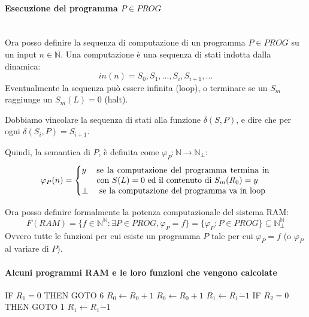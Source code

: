 \documentclass{article}
\begin{document}
\begin{itemize}
          \paragraph{Esecuzione del programma $P\in PROG$}\mbox{}\\
          Ora posso definire la sequenza di computazione di un programma $P\in PROG$ su un input $n\in\mathbb{N}$.
          Una computazione è una sequenza di stati indotta dalla dinamica:
          $$in(n)=S_0, S_1,...,S_i,S_{i+1},...$$
          Eventualmente la sequenza può essere infinita (loop), o terminare se un $S_m$
          raggiunge un $S_m(L)=0$ (halt).

          Dobbiamo vincolare la sequenza di stati alla funzione $\delta (S,P)$,
          e dire che per ogni $\delta(S_i,P)= S_{i+1}$.

          Quindi, la semantica di $P$, è definita come $\varphi_P:\mathbb{N}\rightarrow\mathbb{N}_\bot$:
          \[
              \varphi_P(n)=
              \begin{cases}
                  y    & \parbox[t]{.6\textwidth}{se la computazione del programma termina in con $S(L)=0$
                  ed il contenuto di $S_m(R_0)=y$}                                                        \\
                  \bot & \text{ se la computazione del programma va in loop}
              \end{cases}
          \]
\end{itemize}
Ora posso definire formalmente la potenza computazionale del sistema RAM:
$$F(RAM)=\{f\in\mathbb{N}^{\mathbb{N}}:\exists P\in PROG,\varphi_P = f\}=\{\varphi_P : P\in PROG\}\subsetneq\mathbb{N}^{\mathbb{N}}_{\bot}$$
Ovvero tutte le funzioni per cui esiste un programma $P$ tale per cui $\varphi_P = f$ (o $\varphi_P$ al variare di $P$).

\paragraph{Alcuni programmi RAM e le loro funzioni che vengono calcolate}\mbox{}
\begin{algorithm}[hbt!]
    \caption{$P,\varphi_P(n)=2n$}\label{alg:varphi_2n}
    {IF $R_1=0$ THEN GOTO 6}\;
    $R_0\leftarrow R_0+1$\;
    $R_0\leftarrow R_0+1$\;
    $R_1\leftarrow R_1\dot{-}1$\;
    {IF $R_2=0$ THEN GOTO 1}\;
    $R_1\leftarrow R_1\dot{-}1$
\end{algorithm}
\end{document}
